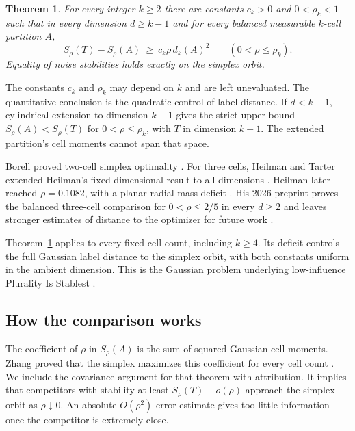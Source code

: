 \documentclass[11pt,reqno]{amsart}
\newtheorem{theorem}{Theorem}[section]
\begin{document}
\begin{theorem}\label{thm:main}
For every integer $k\ge2$ there are constants $c_k>0$ and
$0<\rho_k<1$ such that in every dimension $d\ge k-1$ and for every
balanced measurable $k$-cell partition $A$,
\[
 S_\rho(T)-S_\rho(A)\ \ge\ c_k\rho\,d_k(A)^2
                 \qquad (0<\rho\le\rho_k).
\]
Equality of noise stabilities holds exactly on the simplex orbit.
\end{theorem}

The constants $c_k$ and $\rho_k$ may depend on $k$ and are left
unevaluated. The quantitative conclusion is the quadratic control of
label distance. If $d<k-1$, cylindrical extension to dimension $k-1$
gives the strict upper bound
$S_\rho(A)<S_\rho(T)$ for $0<\rho\le\rho_k$, with $T$ in dimension
$k-1$. The extended partition's cell moments cannot span that space.

Borell proved two-cell simplex optimality \cite{Borell}. For three cells,
Heilman and Tarter extended Heilman's fixed-dimensional result to all
dimensions \cite{Heilman14,HT}. Heilman later reached $\rho=0.1082$,
with a planar radial-mass deficit \cite[Theorem~1.5]{Heilman23}.
His 2026 preprint proves the balanced three-cell comparison for
$0<\rho\le2/5$ in every $d\ge2$ \cite[Theorems~1.2 and~A.1]{Heilman26}
and leaves stronger estimates of distance to the optimizer for
future work \cite[Section~1.4]{Heilman26}.

Theorem~\ref{thm:main} applies to every fixed cell count, including
$k\ge4$. Its deficit controls the full Gaussian label distance to the
simplex orbit, with both constants uniform in the ambient dimension.
This is the Gaussian problem underlying low-influence Plurality Is
Stablest \cite{IM}.

\subsection*{How the comparison works}
The coefficient of $\rho$ in $S_\rho(A)$ is the sum of squared Gaussian
cell moments. Zhang proved that the simplex maximizes this coefficient
for every cell count \cite{Zhang}. We include the covariance argument
for that theorem with attribution. It implies that competitors with
stability at least $S_\rho(T)-o(\rho)$ approach the simplex orbit as
$\rho\downarrow0$. An absolute $O(\rho^2)$ error estimate gives too
little information once the competitor is extremely close.
\end{document}
